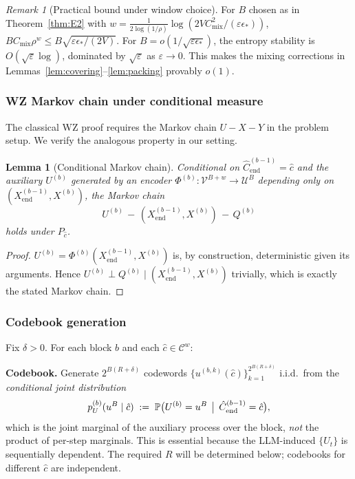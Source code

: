 \documentclass[11pt]{article}
\newcommand{\Prob}{\mathbb{P}}
\theoremstyle{plain}
\newtheorem{lemma}[theorem]{Lemma}
\theoremstyle{definition}
\theoremstyle{remark}
\newtheorem{remark}[theorem]{Remark}
\begin{document}
\begin{remark}[Practical bound under window choice]\label{rmk:Bchoice}
For $B$ chosen as in Theorem~\ref{thm:E2} with
$w = \tfrac{1}{2\log(1/\rho)}\log(2VC_{\mathrm{mix}}^2/(\varepsilon\epsilon_*))$,
$B C_{\mathrm{mix}}\rho^w \leq B\sqrt{\varepsilon\epsilon_*/(2V)}$.
For $B = o(1/\sqrt{\varepsilon\epsilon_*})$, the entropy stability is
$O(\sqrt{\varepsilon}\log)$, dominated by $\sqrt{\varepsilon}$ as
$\varepsilon \to 0$. This makes the mixing corrections in
Lemmas~\ref{lem:covering}--\ref{lem:packing} provably $o(1)$.
\end{remark}

\subsubsection{WZ Markov chain under conditional measure}

The classical WZ proof requires the Markov chain $U - X - Y$ in the
problem setup. We verify the analogous property in our setting.

\begin{lemma}[Conditional Markov chain]\label{lem:markov-conditional}
Conditional on $\hat{C}^{(b-1)}_{\mathrm{end}} = \hat c$ and the
auxiliary $U^{(b)}$ generated by an encoder
$\Phi^{(b)} : \mathcal{V}^{B+w} \to \mathcal{U}^B$ depending only on
$(X^{(b-1)}_{\mathrm{end}}, X^{(b)})$, the Markov chain
\[
U^{(b)} \,-\, (X^{(b-1)}_{\mathrm{end}}, X^{(b)}) \,-\, Q^{(b)}
\]
holds under $P_{\hat c}$.
\end{lemma}

\begin{proof}
$U^{(b)} = \Phi^{(b)}(X^{(b-1)}_{\mathrm{end}}, X^{(b)})$ is, by
construction, deterministic given its arguments. Hence
$U^{(b)} \perp Q^{(b)} \mid (X^{(b-1)}_{\mathrm{end}}, X^{(b)})$
trivially, which is exactly the stated Markov chain.
\end{proof}

\subsubsection{Codebook generation}

Fix $\delta > 0$. For each block $b$ and each
$\hat c \in \mathcal{C}^w$:

\textbf{Codebook.} Generate $2^{B(R + \delta)}$ codewords
$\{u^{(b,k)}(\hat c)\}_{k=1}^{2^{B(R+\delta)}}$ i.i.d.\ from the
\emph{conditional joint distribution}
\[
p_U^{(b)}(u^B \mid \hat c)
\;:=\;
\Prob\bigl(U^{(b)} = u^B \,\bigm|\, \hat C^{(b-1)}_{\mathrm{end}} = \hat c\bigr),
\]
which is the joint marginal of the auxiliary process over the block,
\emph{not} the product of per-step marginals. This is essential because
the LLM-induced $\{U_t\}$ is sequentially dependent. The required $R$
will be determined below; codebooks for different $\hat c$ are
independent.
\end{document}
